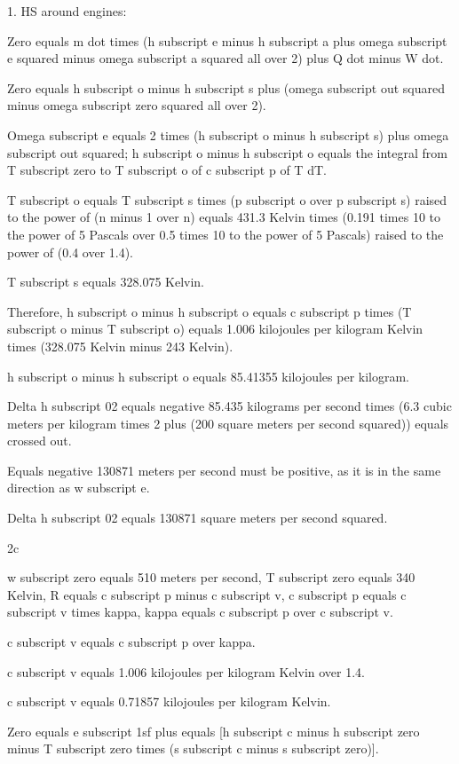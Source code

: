 1. HS around engines:

Zero equals m dot times (h subscript e minus h subscript a plus omega subscript e squared minus omega subscript a squared all over 2) plus Q dot minus W dot.

Zero equals h subscript o minus h subscript s plus (omega subscript out squared minus omega subscript zero squared all over 2).

Omega subscript e equals 2 times (h subscript o minus h subscript s) plus omega subscript out squared; h subscript o minus h subscript o equals the integral from T subscript zero to T subscript o of c subscript p of T dT.

T subscript o equals T subscript s times (p subscript o over p subscript s) raised to the power of (n minus 1 over n) equals 431.3 Kelvin times (0.191 times 10 to the power of 5 Pascals over 0.5 times 10 to the power of 5 Pascals) raised to the power of (0.4 over 1.4).

T subscript s equals 328.075 Kelvin.

Therefore, h subscript o minus h subscript o equals c subscript p times (T subscript o minus T subscript o) equals 1.006 kilojoules per kilogram Kelvin times (328.075 Kelvin minus 243 Kelvin).

h subscript o minus h subscript o equals 85.41355 kilojoules per kilogram.

Delta h subscript 02 equals negative 85.435 kilograms per second times (6.3 cubic meters per kilogram times 2 plus (200 square meters per second squared)) equals crossed out.

Equals negative 130871 meters per second must be positive, as it is in the same direction as w subscript e.

Delta h subscript 02 equals 130871 square meters per second squared.

2c

w subscript zero equals 510 meters per second, T subscript zero equals 340 Kelvin, R equals c subscript p minus c subscript v, c subscript p equals c subscript v times kappa, kappa equals c subscript p over c subscript v.

c subscript v equals c subscript p over kappa.

c subscript v equals 1.006 kilojoules per kilogram Kelvin over 1.4.

c subscript v equals 0.71857 kilojoules per kilogram Kelvin.

Zero equals e subscript 1sf plus equals [h subscript c minus h subscript zero minus T subscript zero times (s subscript c minus s subscript zero)].

